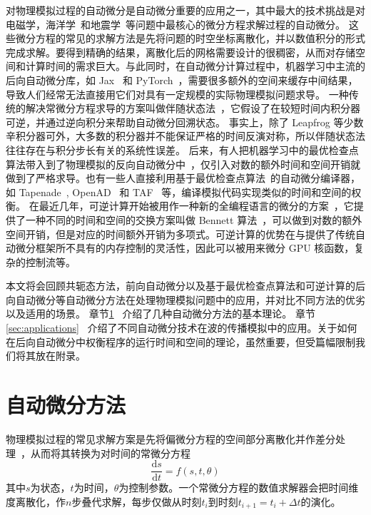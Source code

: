 \documentclass[A4,twoside,UTF8]{ctexart}
\def\D{\mathrm{d}}
\begin{document}
对物理模拟过程的自动微分是自动微分重要的应用之一，其中最大的技术挑战是对电磁学，海洋学~\cite{Heimbach2005}和地震学~\cite{Symes2007,Zhu2021}等问题中最核心的微分方程求解过程的自动微分。
这些微分方程的常见的求解方法是先将问题的时空坐标离散化，并以数值积分的形式完成求解。要得到精确的结果，离散化后的网格需要设计的很稠密，从而对存储空间和计算时间的需求巨大。与此同时，在自动微分计算过程中，机器学习中主流的后向自动微分库，如 Jax~\cite{Bradbury2018} 和 PyTorch~\cite{Paszke2019}，需要很多额外的空间来缓存中间结果，导致人们经常无法直接用它们对具有一定规模的实际物理模拟问题求导。
一种传统的解决常微分方程求导的方案叫做伴随状态法~\cite{Plessix2006,Chen2018}，它假设了在较短时间内积分器可逆，并通过逆向积分来帮助自动微分回溯状态。
事实上，除了 Leapfrog 等少数辛积分器可外，大多数的积分器并不能保证严格的时间反演对称，所以伴随状态法往往存在与积分步长有关的系统性误差。
后来，有人把机器学习中的最优检查点算法带入到了物理模拟的反向自动微分中~\cite{Symes2007}，仅引入对数的额外时间和空间开销就做到了严格求导。也有一些人直接利用基于最优检查点算法~\cite{Griewank1992,Forget2015}的自动微分编译器，如 Tapenade~\cite{Hascoet2013}, OpenAD~\cite{Utke2008} 和 TAF~\cite{Heimbach2005} 等，编译模拟代码实现类似的时间和空间的权衡。
在最近几年，可逆计算开始被用作一种新的全编程语言的微分的方案~\cite{Liu2020b}，它提供了一种不同的时间和空间的交换方案叫做 Bennett 算法~\cite{Levine1990}，可以做到对数的额外空间开销，但是对应的时间额外开销为多项式。可逆计算的优势在与提供了传统自动微分框架所不具有的内存控制的灵活性，因此可以被用来微分 GPU 核函数，复杂的控制流等。

   本文将会回顾共轭态方法，前向自动微分以及基于最优检查点算法和可逆计算的后向自动微分等自动微分方法在处理物理模拟问题中的应用，并对比不同方法的优劣以及适用的场景。
章节\ref{sec:forwardbackward}~ 介绍了几种自动微分方法的基本理论。
章节\ref{sec:applications}~ 介绍了不同自动微分技术在波的传播模拟中的应用。关于如何在后向自动微分中权衡程序的运行时间和空间的理论，虽然重要，但受篇幅限制我们将其放在附录。

\section{自动微分方法}\label{sec:forwardbackward}

    物理模拟过程的常见求解方案是先将偏微分方程的空间部分离散化并作差分处理~\cite{Grote2010}，从而将其转换为对时间的常微分方程
    $$\frac{\D s}{\D t} = f(s, t, \theta)$$
其中$s$为状态，$t$为时间，$\theta$为控制参数。一个常微分方程的数值求解器会把时间维度离散化，作$n$步叠代求解，每步仅做从时刻$t_i$到时刻$t_{i+1} = t_{i}+\Delta t$的演化。
\end{document}
